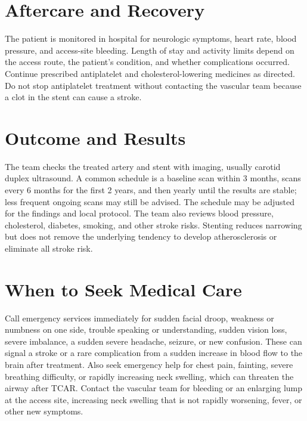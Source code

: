 \section*{Aftercare and Recovery}
The patient is monitored in hospital for neurologic symptoms, heart rate, blood pressure, and access-site bleeding. Length of stay and activity limits depend on the access route, the patient's condition, and whether complications occurred. Continue prescribed antiplatelet and cholesterol-lowering medicines as directed. Do not stop antiplatelet treatment without contacting the vascular team because a clot in the stent can cause a stroke.

\section*{Outcome and Results}
The team checks the treated artery and stent with imaging, usually carotid duplex ultrasound. A common schedule is a baseline scan within 3 months, scans every 6 months for the first 2 years, and then yearly until the results are stable; less frequent ongoing scans may still be advised. The schedule may be adjusted for the findings and local protocol. The team also reviews blood pressure, cholesterol, diabetes, smoking, and other stroke risks. Stenting reduces narrowing but does not remove the underlying tendency to develop atherosclerosis or eliminate all stroke risk.

\section*{When to Seek Medical Care}
Call emergency services immediately for sudden facial droop, weakness or numbness on one side, trouble speaking or understanding, sudden vision loss, severe imbalance, a sudden severe headache, seizure, or new confusion. These can signal a stroke or a rare complication from a sudden increase in blood flow to the brain after treatment. Also seek emergency help for chest pain, fainting, severe breathing difficulty, or rapidly increasing neck swelling, which can threaten the airway after TCAR. Contact the vascular team for bleeding or an enlarging lump at the access site, increasing neck swelling that is not rapidly worsening, fever, or other new symptoms.


